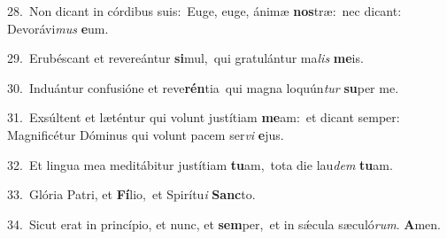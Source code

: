 {\numbfont\textcolor{\numbcolor}{28.}}~Non dicant in córdibus suis:~\dagger Euge, euge, ánimæ \textbf{nos}\-træ:~\star nec dicant: Devorávi\textit{mus} \textbf{e}\-um.\par
{\numbfont\textcolor{\numbcolor}{29.}}~Erubéscant et revereántur \textbf{si}\-mul,~\star qui gratulántur ma\textit{lis} \textbf{me}\-is.\par
{\numbfont\textcolor{\numbcolor}{30.}}~Induántur confusióne et reve\-\textbf{rén}\-tia~\star qui magna loquún\textit{tur} \textbf{su}\-per me.\par
{\numbfont\textcolor{\numbcolor}{31.}}~Exsúltent et læténtur qui volunt justítiam \textbf{me}\-am:~\star et dicant semper: Magnificétur Dóminus qui volunt pacem ser\textit{vi} \textbf{e}\-jus.\par
{\numbfont\textcolor{\numbcolor}{32.}}~Et lingua mea meditábitur justítiam \textbf{tu}\-am,~\star tota die lau\textit{dem} \textbf{tu}\-am.\par
{\numbfont\textcolor{\numbcolor}{33.}}~Glória Patri, et \textbf{Fí}\-lio,~\star et Spirítu\textit{i} \textbf{Sanc}\-to.\par
{\numbfont\textcolor{\numbcolor}{34.}}~Sicut erat in princípio, et nunc, et \textbf{sem}\-per,~\star et in sǽcula sæculó\-\textit{rum}\-. \textbf{A}\-men.\par
